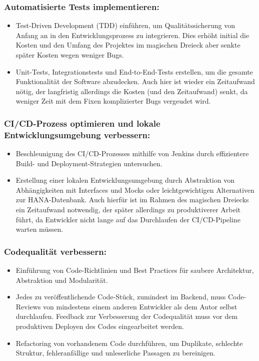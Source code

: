 \subsubsection*{Automatisierte Tests implementieren:}

\begin{itemize}
	\item Test-Driven Development (TDD) einführen, um Qualitätssicherung von Anfang an in den Entwicklungsprozess zu integrieren.
	Dies erhöht initial die Kosten und den Umfang des Projektes im magischen Dreieck aber senkte später Kosten wegen weniger Bugs.
	\item Unit-Tests, Integrationstests und End-to-End-Tests erstellen, um die gesamte Funktionalität der Software abzudecken.
	Auch hier ist wieder ein Zeitaufwand nötig, der langfristig allerdings die Kosten (und den Zeitaufwand) senkt,
	da weniger Zeit mit dem Fixen komplizierter Bugs vergeudet wird. 
\end{itemize}

\subsubsection*{CI/CD-Prozess optimieren und lokale Entwicklungsumgebung verbessern:}

\begin{itemize}
	\item Beschleunigung des CI/CD-Prozesses mithilfe von Jenkins durch effizientere Build- und Deployment-Strategien untersuchen.
	\item Erstellung einer lokalen Entwicklungsumgebung durch Abstraktion von Abhängigkeiten mit Interfaces und Mocks 
	oder leichtgewichtigen Alternativen zur HANA-Datenbank. 
	Auch hierfür ist im Rahmen des magischen Dreiecks ein Zeitaufwand notwendig, 
	der später allerdings zu produktiverer Arbeit führt, da Entwickler nicht lange auf das Durchlaufen der CI/CD-Pipeline warten müssen. 
\end{itemize}

\subsubsection*{Codequalität verbessern:}

\begin{itemize}
	\item Einführung von Code-Richtlinien und Best Practices für saubere Architektur, Abstraktion und Modularität.
	\item Jedes zu veröffentlichende Code-Stück, zumindest im Backend, 
	muss Code-Reviews von mindestens einem anderen Entwickler als dem Autor selbst durchlaufen.
	Feedback zur Verbesserung der Codequalität muss vor dem produktiven Deployen des Codes eingearbeitet werden. 
	\item Refactoring von vorhandenem Code durchführen, um Duplikate, schlechte Struktur, fehleranfällige 
	und unleserliche Passagen zu bereinigen.
\end{itemize}

